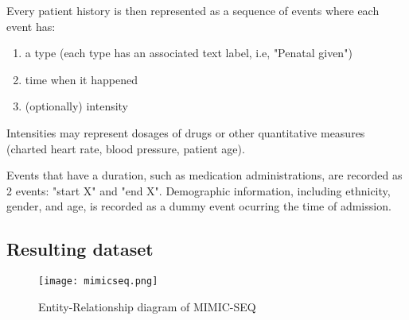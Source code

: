 Every patient history is then represented as a sequence of events where each event has:
\begin{enumerate}
    \item a type (each type has an associated text label, i.e, "Penatal given")
    \item time when it happened
    \item (optionally) intensity
\end{enumerate}

Intensities may represent dosages of drugs or other quantitative measures (charted heart rate, blood pressure, patient age).

Events that have a duration, such as medication administrations, are recorded as 2 events: "start X" and "end X". 
Demographic information, including ethnicity, gender, and age, is recorded as a dummy event ocurring the time of admission.

\subsection{Resulting dataset}

\begin{figure}
    \centering
    \texttt{[image: mimicseq.png]}
    \caption{Entity-Relationship diagram of MIMIC-SEQ}
    \label{fig:enter-label}
\end{figure}

